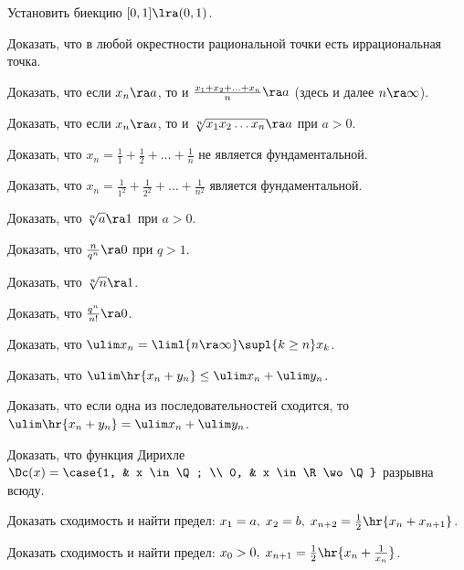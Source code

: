 \documentclass[a4paper]{article}
\begin{document}
\begin{problem}
Установить биекцию $[0, 1] \lra (0, 1)$.
\end{problem}
\begin{problem}
Доказать, что в любой окрестности рациональной точки есть иррациональная точка.
\end{problem}
\begin{problem}
Доказать, что если $x_n \ra a$, то и $\frac{x_1 + x_2 + \ldots + x_n }{n} \ra a$ (здесь и далее $n \ra \infty$).
\end{problem}
\begin{problem}
Доказать, что если $x_n \ra a$, то и $\sqrt[n]{x_1 x_2 \ldots x_n } \ra a$ при $a > 0$.
\end{problem}
\begin{problem}
Доказать, что $x_n = \frac{1}{1} + \frac{1}{2} + \ldots + \frac{1}{n}$ не является фундаментальной.
\end{problem}
\begin{problem}
Доказать, что $x_n = \frac{1}{1^2} + \frac{1}{2^2} + \ldots + \frac{1}{n^2}$ является фундаментальной.
\end{problem}
\begin{problem}
Доказать, что $\sqrt[n]{a} \ra 1$ при $a > 0$.
\end{problem}
\begin{problem}
Доказать, что $\frac{n}{q^n} \ra 0$ при $q > 1$.
\end{problem}
\begin{problem}
Доказать, что $\sqrt[n]{n} \ra 1$.
\end{problem}
\begin{problem}
Доказать, что $\frac{q^n}{n!} \ra 0$.
\end{problem}
\begin{problem}
Доказать, что $\ulim x_n = \liml{n\ra \infty} \supl{k\ge n} x_k$.
\end{problem}
\begin{problem}
Доказать, что $\ulim\hr{x_n + y_n} \le \ulim x_n + \ulim y_n$.
\end{problem}
\begin{problem}
Доказать, что если одна из последовательностей сходится, то $\ulim \hr{x_n + y_n} = \ulim x_n + \ulim y_n$.
\end{problem}
\begin{problem}
Доказать, что функция Дирихле $\Dc(x) = \case{1, & x \in \Q; \\ 0, & x \in \R \wo \Q}$ разрывна всюду.
\end{problem}
\begin{problem}
Доказать сходимость и найти предел: $x_1 = a, \; x_2 = b, \; x_{n+2} = \frac{1}{2}\hr{x_n + x_{n + 1}}$.
\end{problem}
\begin{problem}
Доказать сходимость и найти предел: $x_0 > 0, \; x_{n + 1} = \frac{1}{2}\hr{x_n + \frac{1}{x_n}}$.
\end{problem}
\end{document}

